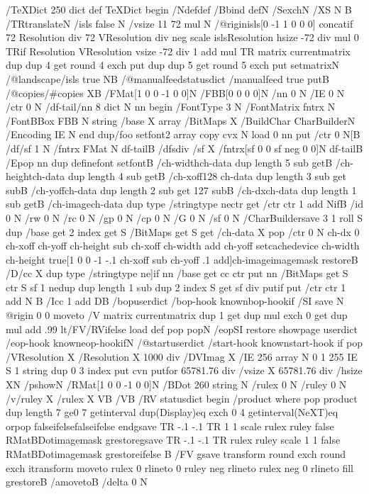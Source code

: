 /TeXDict 250 dict def TeXDict begin /N{def}def /B{bind def}N /S{exch}N /X{S N}
B /TR{translate}N /isls false N /vsize 11 72 mul N /@rigin{isls{[0 -1 1 0 0 0]
concat}if 72 Resolution div 72 VResolution div neg scale isls{Resolution hsize
-72 div mul 0 TR}if Resolution VResolution vsize -72 div 1 add mul TR matrix
currentmatrix dup dup 4 get round 4 exch put dup dup 5 get round 5 exch put
setmatrix}N /@landscape{/isls true N}B /@manualfeed{statusdict /manualfeed
true put}B /@copies{/#copies X}B /FMat[1 0 0 -1 0 0]N /FBB[0 0 0 0]N /nn 0 N
/IE 0 N /ctr 0 N /df-tail{/nn 8 dict N nn begin /FontType 3 N /FontMatrix
fntrx N /FontBBox FBB N string /base X array /BitMaps X /BuildChar{
CharBuilder}N /Encoding IE N end dup{/foo setfont}2 array copy cvx N load 0 nn
put /ctr 0 N[}B /df{/sf 1 N /fntrx FMat N df-tail}B /dfs{div /sf X /fntrx[sf 0
0 sf neg 0 0]N df-tail}B /E{pop nn dup definefont setfont}B /ch-width{ch-data
dup length 5 sub get}B /ch-height{ch-data dup length 4 sub get}B /ch-xoff{128
ch-data dup length 3 sub get sub}B /ch-yoff{ch-data dup length 2 sub get 127
sub}B /ch-dx{ch-data dup length 1 sub get}B /ch-image{ch-data dup type
/stringtype ne{ctr get /ctr ctr 1 add N}if}B /id 0 N /rw 0 N /rc 0 N /gp 0 N
/cp 0 N /G 0 N /sf 0 N /CharBuilder{save 3 1 roll S dup /base get 2 index get
S /BitMaps get S get /ch-data X pop /ctr 0 N ch-dx 0 ch-xoff ch-yoff ch-height
sub ch-xoff ch-width add ch-yoff setcachedevice ch-width ch-height true[1 0 0
-1 -.1 ch-xoff sub ch-yoff .1 add]{ch-image}imagemask restore}B /D{/cc X dup
type /stringtype ne{]}if nn /base get cc ctr put nn /BitMaps get S ctr S sf 1
ne{dup dup length 1 sub dup 2 index S get sf div put}if put /ctr ctr 1 add N}
B /I{cc 1 add D}B /bop{userdict /bop-hook known{bop-hook}if /SI save N @rigin
0 0 moveto /V matrix currentmatrix dup 1 get dup mul exch 0 get dup mul add
.99 lt{/FV}{/RV}ifelse load def pop pop}N /eop{SI restore showpage userdict
/eop-hook known{eop-hook}if}N /@start{userdict /start-hook known{start-hook}
if pop /VResolution X /Resolution X 1000 div /DVImag X /IE 256 array N 0 1 255
{IE S 1 string dup 0 3 index put cvn put}for 65781.76 div /vsize X 65781.76
div /hsize X}N /p{show}N /RMat[1 0 0 -1 0 0]N /BDot 260 string N /rulex 0 N
/ruley 0 N /v{/ruley X /rulex X V}B /V{}B /RV statusdict begin /product where{
pop product dup length 7 ge{0 7 getinterval dup(Display)eq exch 0 4
getinterval(NeXT)eq or}{pop false}ifelse}{false}ifelse end{{gsave TR -.1 -.1
TR 1 1 scale rulex ruley false RMat{BDot}imagemask grestore}}{{gsave TR -.1
-.1 TR rulex ruley scale 1 1 false RMat{BDot}imagemask grestore}}ifelse B /FV{
gsave transform round exch round exch itransform moveto rulex 0 rlineto 0
ruley neg rlineto rulex neg 0 rlineto fill grestore}B /a{moveto}B /delta 0 N
